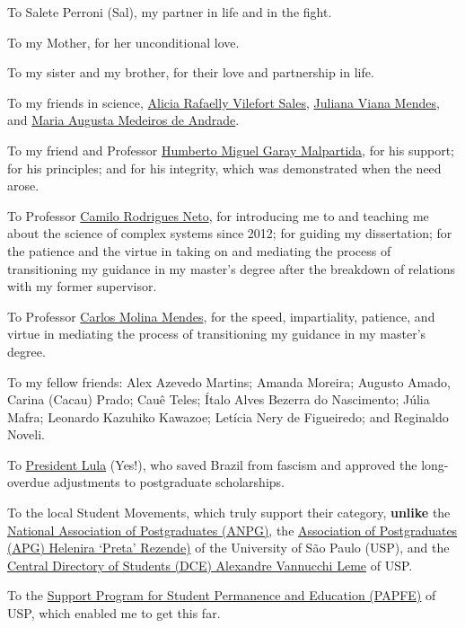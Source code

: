 \documentclass[
  12pt,
  a4paper,
  oneside]{tesesusp}
\begin{document}

To Salete Perroni (Sal), my partner in life and in the fight.

To my Mother, for her unconditional love.

To my sister and my brother, for their love and partnership in life.

To my friends in science,
\href{https://orcid.org/0000-0003-0004-4487}{Alicia Rafaelly Vilefort
Sales}, \href{https://orcid.org/0000-0002-8222-5240}{Juliana Viana
Mendes}, and \href{https://orcid.org/0000-0002-9283-9967}{Maria Augusta
Medeiros de Andrade}.

To my friend and Professor
\href{https://orcid.org/0000-0002-1164-2055}{Humberto Miguel Garay
Malpartida}, for his support; for his principles; and for his integrity,
which was demonstrated when the need arose.

To Professor \href{https://orcid.org/0000-0001-6783-6695}{Camilo
Rodrigues Neto}, for introducing me to and teaching me about the science
of complex systems since 2012; for guiding my dissertation; for the
patience and the virtue in taking on and mediating the process of
transitioning my guidance in my master's degree after the breakdown of
relations with my former supervisor.

To Professor \href{https://orcid.org/0000-0003-2916-4415}{Carlos Molina
Mendes}, for the speed, impartiality, patience, and virtue in mediating
the process of transitioning my guidance in my master's degree.

To my fellow friends: Alex Azevedo Martins; Amanda Moreira; Augusto
Amado, Carina (Cacau) Prado; Cauê Teles; Ítalo Alves Bezerra do
Nascimento; Júlia Mafra; Leonardo Kazuhiko Kawazoe; Letícia Nery de
Figueiredo; and Reginaldo Noveli.

To \href{https://lula.com.br/}{President Lula} (Yes!), who saved Brazil
from fascism and approved the long-overdue adjustments to postgraduate
scholarships.

To the local Student Movements, which truly support their category,
\textbf{unlike} the \href{https://www.anpg.org.br/}{National Association
of Postgraduates (ANPG)}, the
\href{https://linktr.ee/apguspcapital}{Association of Postgraduates
(APG) Helenira `Preta' Rezende)} of the University of São Paulo (USP),
and the \href{https://www.dceusp.org.br/}{Central Directory of Students
(DCE) Alexandre Vannucchi Leme} of USP.

To the \href{https://prip.usp.br/apoio-estudantil/}{Support Program for
Student Permanence and Education (PAPFE)} of USP, which enabled me to
get this far.
\end{document}
